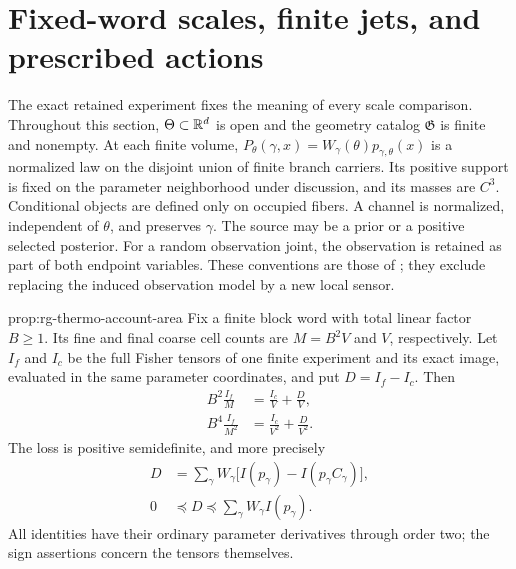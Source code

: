 
\section{Fixed-word scales, finite jets, and prescribed actions}
\label{sec:rg-thermo-accounting-proof}

The exact retained experiment fixes the meaning of every scale comparison.
Throughout this section, $\Theta\subset\mathbb R^d$ is open and the geometry
catalog $\mathfrak G$ is finite and nonempty. At each finite volume,
$P_\theta(\gamma,x)=W_\gamma(\theta)p_{\gamma,\theta}(x)$ is a
normalized law on the disjoint union of finite branch carriers. Its
positive support is fixed on the parameter neighborhood under discussion,
and its masses are $C^3$. Conditional objects are defined only on
occupied fibers. A channel is normalized, independent of $\theta$, and
preserves $\gamma$. The source may be a prior or a positive selected
posterior. For a random observation joint, the observation is retained
as part of both endpoint variables. These conventions are those of
; they exclude replacing the induced
observation model by a new local sensor.\thermoadoptedhypothesis


{prop:rg-thermo-account-area}
Fix a finite block word with total linear factor $B\geq1$. Its fine and
final coarse cell counts are $M=B^2V$ and $V$, respectively. Let $I_f$
and $I_c$ be the full Fisher tensors of one finite experiment and its
exact image, evaluated in the same parameter coordinates, and put
$D=I_f-I_c$. Then
\begin{align}
 B^2\frac{I_f}{M}&=\frac{I_c}{V}+\frac{D}{V},
 \label{eq:rg-thermo-account-extensive}\\
 B^4\frac{I_f}{M^2}&=\frac{I_c}{V^2}+\frac{D}{V^2}.
 \label{eq:rg-thermo-account-quadratic}
\end{align}
The loss is positive semidefinite, and more precisely
\begin{equation}
 \begin{aligned}
 D&=\sum_\gamma W_\gamma
    \bigl[I(p_\gamma)-I(p_\gamma C_\gamma)\bigr],\\
 0&\preceq D\preceq\sum_\gamma W_\gamma I(p_\gamma).
 \end{aligned}
 \label{eq:rg-thermo-account-branch-bound}
\end{equation}
All identities have their ordinary parameter derivatives through order
two; the sign assertions concern the tensors themselves.\thermoestablishedstatus



